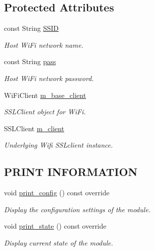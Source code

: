 \subsection*{Protected Attributes}
\begin{DoxyCompactItemize}
\item 
const String \hyperlink{class_loom___wi_fi_a79239f0be6d0094eef2b2e47cac5e252}{S\+S\+ID}
\begin{DoxyCompactList}\small\item\em Host Wi\+Fi network name. \end{DoxyCompactList}\item 
const String \hyperlink{class_loom___wi_fi_a36402713f3a011add130d1b0b8182822}{pass}
\begin{DoxyCompactList}\small\item\em Host Wi\+Fi network password. \end{DoxyCompactList}\item 
Wi\+Fi\+Client \hyperlink{class_loom___wi_fi_ac3c4d4aaaea4f70ac9b613a5248a7070}{m\+\_\+base\+\_\+client}
\begin{DoxyCompactList}\small\item\em S\+S\+L\+Client object for Wi\+Fi. \end{DoxyCompactList}\item 
S\+S\+L\+Client \hyperlink{class_loom___wi_fi_aece9cee623f146f89ee4d282aa012c79}{m\+\_\+client}
\begin{DoxyCompactList}\small\item\em Underlying Wifi S\+S\+Lclient instance. \end{DoxyCompactList}\end{DoxyCompactItemize}
\subsection*{P\+R\+I\+NT I\+N\+F\+O\+R\+M\+A\+T\+I\+ON}
\begin{DoxyCompactItemize}
\item 
void \hyperlink{class_loom___wi_fi_acf10d90ceedbe039f216b7d1544eb935}{print\+\_\+config} () const override
\begin{DoxyCompactList}\small\item\em Display the configuration settings of the module. \end{DoxyCompactList}\item 
void \hyperlink{class_loom___wi_fi_ab3663639761f7748602fbddd8c713087}{print\+\_\+state} () const override
\begin{DoxyCompactList}\small\item\em Display current state of the module. \end{DoxyCompactList}\end{DoxyCompactItemize}
